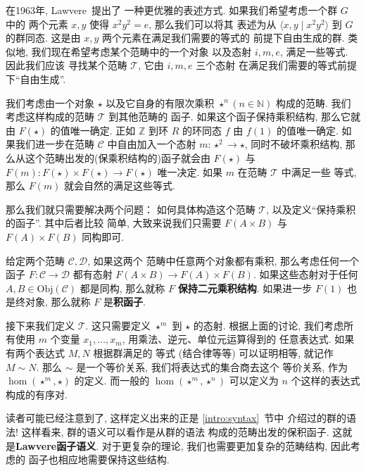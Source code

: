 在1963年, Lawvere~\cite{Lawvere:1963:functorial}提出了
一种更优雅的表述方式. 如果我们希望考虑一个群 \(G\) 中的
两个元素 \(x,y\) 使得 \(x^2y^2 = e\), 那么我们可以将其
表述为从 \(\langle x,y \mid x^2y^2 \rangle\) 到 \(G\)
的群同态. 这是由 \(x,y\) 两个元素在满足我们需要的等式的
前提下自由生成的群.
类似地, 我们现在希望考虑某个范畴中的一个对象
以及态射 \(i,m,e\), 满足一些等式. 因此我们应该
寻找某个范畴 \(\mathcal T\), 它由 \(i,m,e\) 三个态射
在满足我们需要的等式前提下“自由生成”.

我们考虑由一个对象 \(\star\)
以及它自身的有限次乘积 \(\star^n (n \in \mathbb N)\) 构成的范畴.
我们考虑这样构成的范畴 \(\mathcal T\) 到其他范畴的
函子. 如果这个函子保持乘积结构, 那么它就由 \(F(\star)\)
的值唯一确定. 正如 \(\mathbb Z\) 到环 \(R\) 的环同态 \(f\)
由 \(f(1)\) 的值唯一确定. 如果我们进一步在范畴 \(\mathcal C\)
中自由加入一个态射 \(m:\star^2 \to \star\), 同时不破坏乘积结构,
那么从这个范畴出发的(保乘积结构的)函子就会由 \(F(\star)\)
与 \(F(m) : F(\star) \times F(\star) \to F(\star)\)
唯一决定. 如果 \(m\) 在范畴 \(\mathcal T\) 中满足一些
等式, 那么 \(F(m)\) 就会自然的满足这些等式.

那么我们就只需要解决两个问题： 如何具体构造这个范畴
\(\mathcal T\), 以及定义“保持乘积的函子”. 其中后者比较
简单, 大致来说我们只需要 \(F(A \times B)\) 与 \(F(A) \times F(B)\) 同构即可.
\begin{definition}
给定两个范畴 \(\mathcal C,\mathcal D\), 如果这两个
范畴中任意两个对象都有乘积, 那么考虑任何一个函子 \(F : \mathcal C \to \mathcal D\)
都有态射 \(F(A \times B) \to F(A) \times F(B)\).
如果这些态射对于任何 \(A,B \in \mathrm{Obj}(\mathcal C)\)
都是同构, 那么就称 \(F\) \textbf{保持二元乘积结构}.
如果进一步 \(F(1)\) 也是终对象, 那么就称 \(F\) 是\textbf{积函子}.
\end{definition}

接下来我们定义 \(\mathcal T\). 这只需要定义 \(\star^m\) 到
\(\star\) 的态射. 根据上面的讨论,
我们考虑所有使用 \(m\) 个变量
\(x_1,\dots,x_m\), 用乘法、逆元、单位元运算得到的
任意表达式. 如果有两个表达式 \(M,N\) 根据群满足的
等式 (结合律等等) 可以证明相等, 就记作 \(M \sim N\).
那么 \(\sim\) 是一个等价关系, 我们将表达式的集合商去这个
等价关系, 作为 \(\hom(\star^m, \star)\) 的定义.
而一般的 \(\hom(\star^m, \star^n)\) 可以定义为
\(n\) 个这样的表达式构成的有序对.

读者可能已经注意到了, 这样定义出来的正是 \ref{intro:syntax}~节中
介绍过的群的语法! 这样看来, 群的语义可以看作是从群的语法
构成的范畴出发的保积函子. 这就是\textbf{Lawvere函子语义}.
对于更复杂的理论, 我们也需要更加复杂的范畴结构, 因此考虑的
函子也相应地需要保持这些结构.

